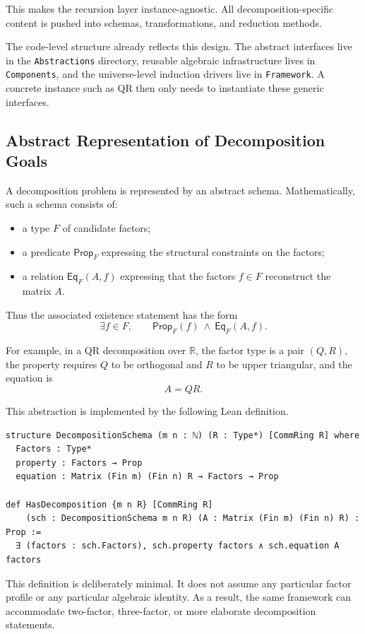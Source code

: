 \documentclass[pdflatex,sn-mathphys-num]{sn-jnl}%
\theoremstyle{thmstyleone}%
\theoremstyle{thmstyletwo}%
\theoremstyle{thmstylethree}%
\begin{document}
This makes the recursion layer instance-agnostic.  All decomposition-specific content is pushed into schemas, transformations, and reduction methods.

The code-level structure already reflects this design.  The abstract interfaces live in the \texttt{Abstractions} directory, reusable algebraic infrastructure lives in \texttt{Components}, and the universe-level induction drivers live in \texttt{Framework}.  A concrete instance such as QR then only needs to instantiate these generic interfaces.

\subsection{Abstract Representation of Decomposition Goals}

A decomposition problem is represented by an abstract schema.  Mathematically, such a schema consists of:

\begin{itemize}
\item a type \(F\) of candidate factors;
\item a predicate \(\mathsf{Prop}_F\) expressing the structural constraints on the factors;
\item a relation \(\mathsf{Eq}_F(A,f)\) expressing that the factors \(f \in F\) reconstruct the matrix \(A\).
\end{itemize}

Thus the associated existence statement has the form
\[
\exists f \in F,\qquad \mathsf{Prop}_F(f)\ \wedge\ \mathsf{Eq}_F(A,f).
\]

For example, in a QR decomposition over \(\mathbb{R}\), the factor type is a pair \((Q,R)\), the property requires \(Q\) to be orthogonal and \(R\) to be upper triangular, and the equation is
\[
A = QR.
\]

This abstraction is implemented by the following Lean definition.

\begin{lstlisting}
structure DecompositionSchema (m n : ℕ) (R : Type*) [CommRing R] where
  Factors : Type*
  property : Factors → Prop
  equation : Matrix (Fin m) (Fin n) R → Factors → Prop

def HasDecomposition {m n R} [CommRing R]
    (sch : DecompositionSchema m n R) (A : Matrix (Fin m) (Fin n) R) : Prop :=
  ∃ (factors : sch.Factors), sch.property factors ∧ sch.equation A factors
\end{lstlisting}

This definition is deliberately minimal.  It does not assume any particular factor profile or any particular algebraic identity.  As a result, the same framework can accommodate two-factor, three-factor, or more elaborate decomposition statements.
\end{document}

